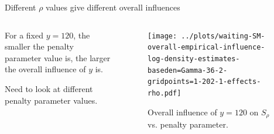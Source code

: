 \documentclass[aspectratio=169,xcolor=dvipsnames]{beamer}
\begin{document}
\begin{frame}{Different $\rho$ values give different overall influences}

	\begin{columns}[c]
	    \begin{column}{.5\textwidth}
	    
	    	
	    	For a fixed $y = 120$, the smaller the penalty parameter value is, the larger the overall influence of $y$ is. 
	    	
	    	\vspace{10pt}
	
			Need to look at different penalty parameter values. 
		
		\end{column}
		
	    \begin{column}{.5\textwidth}
	    \begin{figure}
	        \centering
	        \texttt{[image: ../plots/waiting-SM-overall-empirical-influence-log-density-estimates-baseden=Gamma-36-2-gridpoints=1-202-1-effects-rho.pdf]}
	        \caption{Overall influence of $y = 120$ on $S_{\rho}$ vs. penalty parameter.}
	    \end{figure}
	    \end{column}
	\end{columns}
\end{frame}
\end{document}
